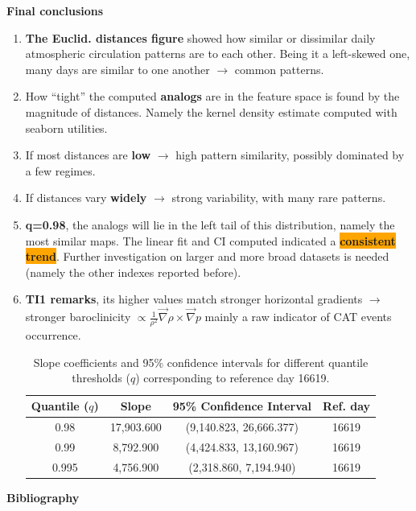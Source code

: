 \documentclass[9pt]{beamer}
\newcommand\Fontvs{\fontsize{4}{6.0}\selectfont}
\newcommand\Fontvi{\fontsize{6}{7.2}\selectfont}
\newcommand\Fonttab{\fontsize{12}{7.2}\selectfont}
\begin{document}
\begin{frame}[allowframebreaks]{\textbf{Final conclusions}}
\begin{enumerate}
\item \textbf{The Euclid. distances figure} showed how similar or dissimilar daily atmospheric circulation patterns are to each other. Being it a left-skewed one, many days are similar to one another $ \longrightarrow$ common patterns.
\item How “tight” the computed \textbf{analogs} are in the feature space is found by the magnitude of distances. Namely the kernel density estimate computed with seaborn utilities.
\item If most distances are \textbf{low} $ \longrightarrow$ high pattern similarity, possibly dominated by a few regimes.
\item If distances vary \textbf{widely} $ \longrightarrow$ strong variability, with many rare patterns.
\Fontvi
\item \textbf{q=0.98}, the analogs will lie in the left tail of this distribution, namely the most similar maps. The linear fit and CI computed indicated a \colorbox{orange}{\textbf{consistent trend}}. Further investigation on larger and more broad datasets is needed (namely the other indexes reported before).
\item \textbf{TI1 remarks}, its higher values match stronger horizontal gradients $ \longrightarrow$ stronger baroclinicity $\propto \frac{1}{\rho^{2}}\vec{\nabla}\rho\times\vec{\nabla}p$ mainly a raw indicator of CAT events occurrence.
\Fontvs
\begin{table}[ht]
    \centering
    \begin{tabular}{|c|c|c|c|}
        \hline
        \textbf{Quantile ($q$)} & \textbf{Slope} & \textbf{95\% Confidence Interval} & \textbf{Ref. day} \\
        \hline
        0.98  & 17,903.600 & (9,140.823, 26,666.377) & 16619 \\
        \hline
        0.99  & 8,792.900  & (4,424.833, 13,160.967) & 16619 \\
        \hline
        0.995 & 4,756.900  & (2,318.860, 7,194.940)  & 16619 \\
        \hline
    \end{tabular}
    \caption{Slope coefficients and 95\% confidence intervals for different quantile thresholds ($q$) corresponding to reference day 16619.}
    \label{tab:slope_CI}
\end{table}
\end{enumerate}
\end{frame}

\begin{frame}[allowframebreaks]{\textbf{Bibliography}}
 
\Fonttab
\scriptsize


\end{frame}
\end{document}
